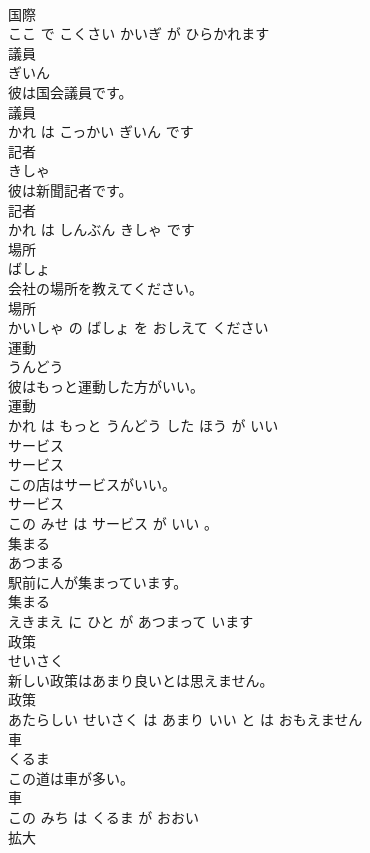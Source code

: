 \documentclass[8pt]{extreport}
\begin{document}
\begin{CJK}{UTF8}{min}
\\	国際 
\\	ここ で こくさい かいぎ が ひらかれます			
\\	議員	
\\	ぎいん			
\\	彼は国会議員です。	
\\	議員 
\\	かれ は こっかい ぎいん です			
\\	記者	
\\	きしゃ			
\\	彼は新聞記者です。	
\\	記者 
\\	かれ は しんぶん きしゃ です			
\\	場所	
\\	ばしょ			
\\	会社の場所を教えてください。	
\\	場所 
\\	かいしゃ の ばしょ を おしえて ください			
\\	運動	
\\	うんどう			
\\	彼はもっと運動した方がいい。	
\\	運動 
\\	かれ は もっと うんどう した ほう が いい			
\\	サービス	
\\	サービス			
\\	この店はサービスがいい。	
\\	サービス 
\\	この みせ は サービス が いい 。			
\\	集まる	
\\	あつまる			
\\	駅前に人が集まっています。	
\\	集まる 
\\	えきまえ に ひと が あつまって います			
\\	政策	
\\	せいさく			
\\	新しい政策はあまり良いとは思えません。	
\\	政策 
\\	あたらしい せいさく は あまり いい と は おもえません			
\\	車	
\\	くるま			
\\	この道は車が多い。	
\\	車 
\\	この みち は くるま が おおい			
\\	拡大	

\end{CJK}
\end{document}
